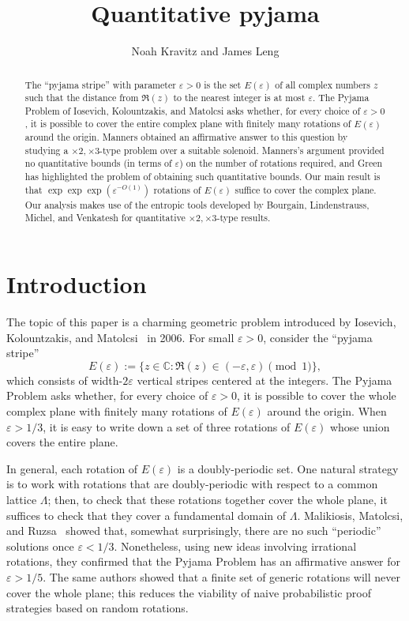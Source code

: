 \documentclass[11pt]{amsart}
\theoremstyle{definition}
\begin{document}
\title{Quantitative pyjama}
\author{Noah Kravitz and James Leng}

\begin{abstract}
The ``pyjama stripe'' with parameter $\varepsilon>0$ is the set $E(\varepsilon)$ of all complex numbers $z$ such that the distance from $\Re(z)$ to the nearest integer is at most $\varepsilon$.  The Pyjama Problem of Iosevich, Kolountzakis, and Matolcsi asks whether, for every choice of $\varepsilon>0$, it is possible to cover the entire complex plane with finitely many rotations of $E(\varepsilon)$ around the origin.  Manners obtained an affirmative answer to this question by studying a $\times 2, \times 3$-type problem over a suitable solenoid.  Manners's argument provided no quantitative bounds (in terms of $\varepsilon$) on the number of rotations required, and Green has highlighted the problem of obtaining such quantitative bounds.  Our main result is that $\exp\exp\exp(\varepsilon^{-O(1)})$ rotations of $E(\varepsilon)$ suffice to cover the complex plane.  Our analysis makes use of the entropic tools developed by Bourgain, Lindenstrauss, Michel, and Venkatesh for quantitative $\times 2, \times 3$-type results.
\end{abstract}

\maketitle

\section{Introduction}
The topic of this paper is a charming geometric problem introduced by Iosevich, Kolountzakis, and Matolcsi~\cite{iosevich2006covering} in 2006.  For small $\varepsilon>0$, consider the ``pyjama stripe'' $$E(\varepsilon) := \{z \in \mathbb{C}: \Re(z) \in (-\varepsilon, \varepsilon) \pmod{1}\},$$
which consists of width-$2\varepsilon$ vertical stripes centered at the integers.  The Pyjama Problem asks whether, for every choice of $\varepsilon>0$, it is possible to cover the whole complex plane with finitely many rotations of $E(\varepsilon)$ around the origin.  When $\varepsilon>1/3$, it is easy to write down a set of three rotations of $E(\varepsilon)$ whose union covers the entire plane.

In general, each rotation of $E(\varepsilon)$ is a doubly-periodic set.  One natural strategy is to work with rotations that are doubly-periodic with respect to a common lattice $\Lambda$; then, to check that these rotations together cover the whole plane, it suffices to check that they cover a fundamental domain of $\Lambda$.  Malikiosis, Matolcsi, and Ruzsa~\cite{malikiosis2013note} showed that, somewhat surprisingly, there are no such ``periodic'' solutions once $\varepsilon<1/3$.  Nonetheless, using new ideas involving irrational rotations, they confirmed that the Pyjama Problem has an affirmative answer for $\varepsilon>1/5$.  The same authors showed that a finite set of generic rotations will never cover the whole plane; this reduces the viability of naive probabilistic proof strategies based on random rotations.
\end{document}
